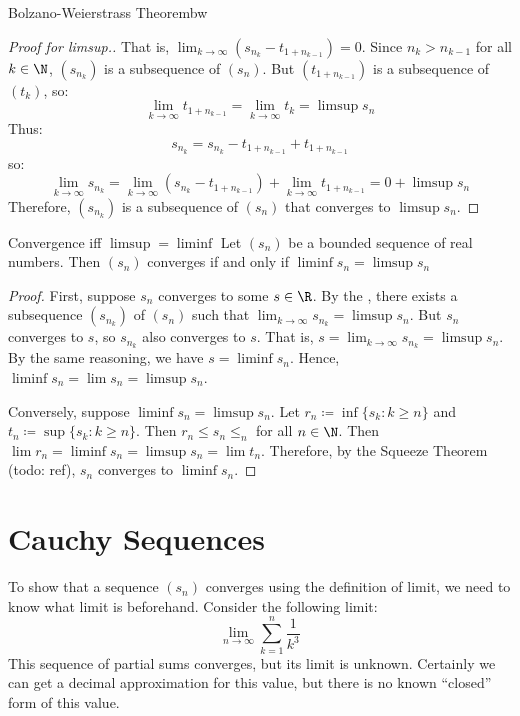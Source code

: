 \begin{thmbox}{Bolzano-Weierstrass Theorem}{bw}
\begin{proof}[Proof for limsup.]
        That is, $\lim_{k \to \infty} \left( s_{n_k} - t_{1+ n_{k-1}} \right) = 0$. Since $n_k > n_{k-1}$ for all $k \in \N$, $(s_{n_k})$ is a subsequence of $(s_n)$. But $(t_{1 + n_{k-1}})$ is a subsequence of $(t_k)$, so:
        \[ \lim_{k \to \infty} t_{1 + n_{k-1}} = \lim_{k \to \infty} t_k = \limsup s_n \]
        Thus:
        \[ s_{n_k} = s_{n_k} - t_{1 + n_{k-1}} + t_{1 + n_{k-1}} \]
        so:
        \[ \lim_{k \to \infty} s_{n_k} = \lim_{k \to\infty} \left( s_{n_k} - t_{1 + n_{k-1}} \right) + \lim_{k \to \infty} t_{1 + n_{k-1}} = 0 + \limsup s_n \]
        Therefore, $(s_{n_k})$ is a subsequence of $(s_n)$ that converges to $\limsup s_n$.
    \end{proof}
\end{thmbox}

\begin{thmbox}{Convergence iff $\limsup = \liminf$}{}
    Let $(s_n)$ be a bounded sequence of real numbers. Then $(s_n)$ converges if and only if $\liminf s_n = \limsup s_n$
    \tcblower
    \begin{proof}
        First, suppose $s_n$ converges to some $s \in \R$. By the , there exists a subsequence $(s_{n_k})$ of $(s_n)$ such that $\lim_{k \to \infty} s_{n_k} = \limsup s_n$. But $s_n$ converges to $s$, so $s_{n_k}$ also converges to $s$. That is, $s = \lim_{k \to \infty} s_{n_k} = \limsup s_n$. By the same reasoning, we have $s = \liminf s_n$. Hence, $\liminf s_n = \lim s_n = \limsup s_n$.

        Conversely, suppose $\liminf s_n = \limsup s_n$. Let $r_n \coloneq \inf\{s_k : k \geq n\}$ and $t_n \coloneq \sup\{s_k : k \geq n\}$. Then $r_n \leq s_n \leq _n$ for all $n \in \N$. Then $\lim r_n = \liminf s_n = \limsup s_n = \lim t_n$. Therefore, by the Squeeze Theorem (todo: ref), $s_n$ converges to $\liminf s_n$.
    \end{proof}
\end{thmbox}

\section{Cauchy Sequences}

To show that a sequence $(s_n)$ converges using the definition of limit, we need to know what limit is beforehand. Consider the following limit:
\[ \lim_{n\to\infty} \sum_{k=1}^{n} \frac{1}{k^3} \]
This sequence of partial sums converges, but its limit is unknown. Certainly we can get a decimal approximation for this value, but there is no known ``closed'' form of this value.

